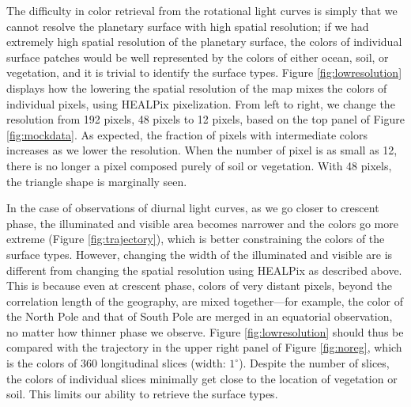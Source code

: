 \documentclass[iop,numberedappendix,apj,]{emulateapj}
\begin{document}
The difficulty in color retrieval from the rotational light curves is simply that we cannot resolve the planetary surface with high spatial resolution; if we had extremely high spatial resolution of the planetary surface, the colors of individual surface patches would be well represented by the colors of either ocean, soil, or vegetation, and it is trivial to identify the surface types. 
Figure \ref{fig:lowresolution} displays how the lowering the spatial resolution of the map mixes the colors of individual pixels, using HEALPix pixelization. 
From left to right, we change the resolution from 192 pixels, 48 pixels to 12 pixels, based on the top panel of Figure \ref{fig:mockdata}. 
As expected, the fraction of pixels with intermediate colors increases as we lower the resolution. 
When the number of pixel is as small as 12, there is no longer a pixel composed purely of soil or vegetation. 
With 48 pixels, the triangle shape is marginally seen. 

In the case of observations of diurnal light curves, as we go closer to crescent phase, the illuminated and visible area becomes narrower and the colors go more extreme (Figure \ref{fig:trajectory}), which is better  constraining the colors of the surface types. 
However, changing the width of the illuminated and visible are is different from changing the spatial resolution using HEALPix as described above. 
This is because even at crescent phase, colors of very distant pixels, beyond the correlation length of the geography, are mixed together---for example, the color of the North Pole and that of South Pole are merged in an equatorial observation, no matter how thinner phase we observe. 
Figure \ref{fig:lowresolution} should thus be compared with the trajectory in the upper right panel of Figure \ref{fig:noreg}, which is the colors of 360 longitudinal slices (width: $1^{\circ }$). 
Despite the number of slices, the colors of individual slices minimally get close to the location of vegetation or soil. 
This limits our ability to retrieve the surface types. 
\end{document}
